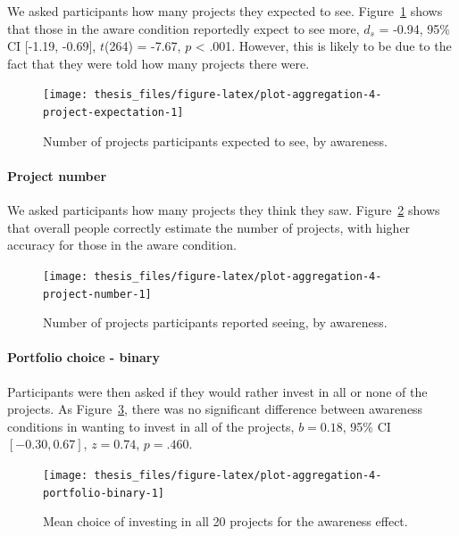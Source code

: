 \documentclass[a4paper, nobind, dvipsnames]{templates/ociamthesis}
\theoremstyle{definition}
\theoremstyle{definition}
\theoremstyle{definition}
\theoremstyle{definition}
\theoremstyle{remark}
\begin{document}
We asked participants how many projects they expected to see.
Figure~\ref{fig:plot-aggregation-4-project-expectation} shows that those in
the aware condition reportedly expect to see more,
\(d_s\) = -0.94, 95\% CI {[}-1.19, -0.69{]}, \(t\)(264) = -7.67, \(p\) \textless{} .001. However, this is likely to be due to
the fact that they were told how many projects there were.



\begin{figure}
\texttt{[image: thesis\_files/figure-latex/plot-aggregation-4-project-expectation-1]} \caption{Number of projects participants expected to see, by awareness.}\label{fig:plot-aggregation-4-project-expectation}
\end{figure}

\hypertarget{project-number-2}{%
\paragraph{Project number}\label{project-number-2}}

We asked participants how many projects they think they saw.
Figure~\ref{fig:plot-aggregation-4-project-number} shows that overall people
correctly estimate the number of projects, with higher accuracy for those in the
aware condition.



\begin{figure}
\texttt{[image: thesis\_files/figure-latex/plot-aggregation-4-project-number-1]} \caption{Number of projects participants reported seeing, by awareness.}\label{fig:plot-aggregation-4-project-number}
\end{figure}

\hypertarget{portfolio-choice---binary-2}{%
\paragraph{Portfolio choice - binary}\label{portfolio-choice---binary-2}}

Participants were then asked if they would rather invest in all or none of the
projects. As Figure~\ref{fig:plot-aggregation-4-portfolio-binary}, there was no
significant difference between awareness conditions in wanting to invest
in all of the projects,
\(b = 0.18\), 95\% CI \([-0.30, 0.67]\), \(z = 0.74\), \(p = .460\).



\begin{figure}
\texttt{[image: thesis\_files/figure-latex/plot-aggregation-4-portfolio-binary-1]} \caption{Mean choice of investing in all 20 projects for the awareness effect.}\label{fig:plot-aggregation-4-portfolio-binary}
\end{figure}
\end{document}
